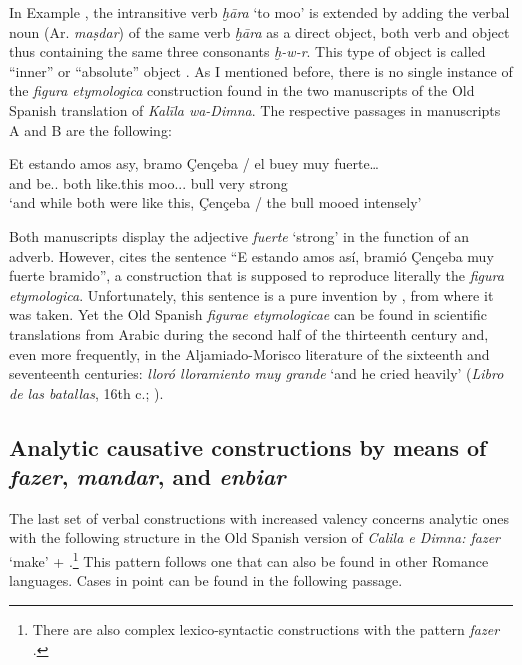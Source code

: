 \documentclass[output=paper]{langscibook}
\begin{document}
In Example , the intransitive verb \textit{ḫāra} ‘to moo’ is extended by adding the verbal noun (Ar. \textit{maṣdar}) of the same verb \textit{ḫāra} as a direct object, both verb and object thus containing the same three consonants \textit{ḫ-w-r}. This type of object is called “inner” or “absolute” object \citep[§§376–377]{fischer_grammatik_1972}. As I mentioned before, there is no single instance of the \textit{figura etymologica} construction found in the two manuscripts of the Old Spanish translation of \textit{Kalīla wa-Dimna}. The respective passages in manuscripts A and B are the following:

\begin{exe}
    \ex\label{doehla:ex:13}
    \gll Et estando amos asy, bramo {Çençeba /} el buey muy {fuerte…} \\
    and be.\ACT.\PTCP{} both like.this moo.\Third\SG.\PST.\PFV{} \PN{} \Def{} bull very strong \\
    \glt ‘and while both were like this, Çençeba / the bull mooed intensely’ \citep[A/BI.45a]{dohla_libro_2009}
\end{exe}


Both manuscripts display the adjective \textit{fuerte} ‘strong’ in the function of an adverb. However, \citet[201]{galmes_de_fuentes_influencia_1996} cites the sentence “E estando amos así, bramió Çençeba muy fuerte bramido”, a construction that is supposed to reproduce literally the \textit{figura etymologica}. Unfortunately, this sentence is a pure invention by \citet[76]{alemany_y_bolufer_antigua_1915}, from where it was taken. Yet the Old Spanish \textit{figurae etymologicae} can be found in scientific translations from Arabic during the second half of the thirteenth century and, even more frequently, in the Aljamiado-Morisco literature of the sixteenth and seventeenth centuries: \textit{lloró lloramiento muy grande} ‘and he cried heavily’ (\textit{Libro de las batallas}, 16th c.; \citealt[203]{galmes_de_fuentes_influencia_1996}).

\subsection{Analytic causative constructions by means of \textit{fazer}, \textit{mandar}, and \textit{enbiar}}\label{dohla:sec:5.3}

The last set of verbal constructions with increased valency concerns analytic ones with the following structure in the Old Spanish version of 
\textit{Calila e Dimna: fazer} ‘make’ + \Inf{} \citep{alfonso_vega_verbos_2006, aranda_ortiz_expresion_nodate, sanaphre_villanueva_analytic_2010}.\footnote{There are also complex lexico-syntactic constructions with the pattern \textit{fazer} \COMPL{} \CLAUSE{}.}  This pattern follows one that can also be found in other Romance languages. Cases in point can be found in the following passage.
\end{document}
